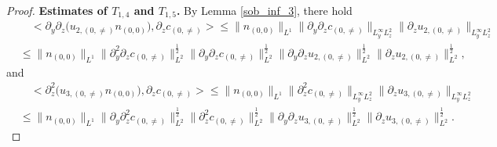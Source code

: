 \documentclass[12pt, reqno]{amsart}
\numberwithin{equation}{section}
\begin{document}
\begin{proof}
		
		\textbf{Estimates of $T_{1,4}$ and $T_{1,5}$.}	
		By Lemma \ref{sob_inf_3}, there hold
		\begin{equation}\label{t13_temp1}
			\begin{aligned}
				&\quad<\partial_y\partial_z\big(u_{2,(0,\neq)}n_{(0,0)}\big),\partial_zc_{(0,\neq)}>\leq \|n_{(0,0)}\|_{L^1}
				\|\partial_y\partial_zc_{(0,\neq)}\|_{L^{\infty}_yL^2_z}
				\|\partial_zu_{2,(0,\neq)}\|_{L^{\infty}_yL^2_z}\\
				&\leq \|n_{(0,0)}\|_{L^1}
				\|\partial_y^2\partial_zc_{(0,\neq)}\|^{\frac12}_{L^2}
				\|\partial_y\partial_zc_{(0,\neq)}\|^{\frac12}_{L^2}
				\|\partial_y\partial_zu_{2,(0,\neq)}\|^{\frac12}_{L^2}
				\|\partial_zu_{2,(0,\neq)}\|^{\frac12}_{L^2},
			\end{aligned}
		\end{equation}
		and 
		\begin{equation}\label{t13_temp2}
			\begin{aligned}
				&\quad<\partial_z^2\big(u_{3,(0,\neq)}n_{(0,0)}\big),\partial_zc_{(0,\neq)}>\leq \|n_{(0,0)}\|_{L^1}
				\|\partial_z^2c_{(0,\neq)}\|_{L^{\infty}_yL^2_z}
				\|\partial_zu_{3,(0,\neq)}\|_{L^{\infty}_yL^2_z}\\
				&\leq \|n_{(0,0)}\|_{L^1}
				\|\partial_y\partial_z^2c_{(0,\neq)}\|^{\frac12}_{L^2}
				\|\partial_z^2c_{(0,\neq)}\|^{\frac12}_{L^2}
				\|\partial_y\partial_zu_{3,(0,\neq)}\|^{\frac12}_{L^2}
				\|\partial_zu_{3,(0,\neq)}\|^{\frac12}_{L^2}.
			\end{aligned}
		\end{equation}
		

\end{proof}
\end{document}
